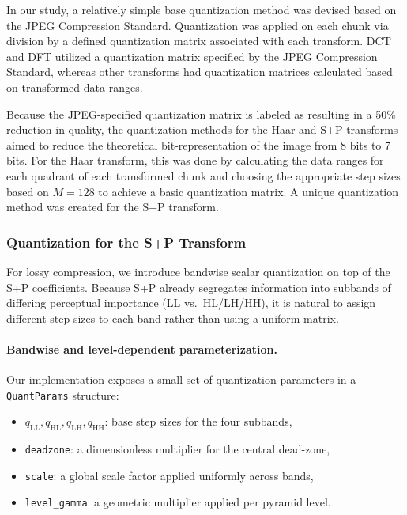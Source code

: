 In our study, a relatively simple base quantization method was devised based on the JPEG Compression Standard. Quantization was applied on each chunk via division by a defined quantization matrix associated with each transform. DCT and DFT utilized a quantization matrix specified by the JPEG Compression Standard, whereas other transforms had quantization matrices calculated based on transformed data ranges.

Because the JPEG-specified quantization matrix is labeled as resulting in a 50\% reduction in quality, the quantization methods for the Haar and S+P transforms aimed to reduce the theoretical bit-representation of the image from 8 bits to 7 bits. For the Haar transform, this was done by calculating the data ranges for each quadrant of each transformed chunk and choosing the appropriate step sizes based on $M = 128$ to achieve a basic quantization matrix. A unique quantization method was created for the S+P transform. 
\subsubsection{Quantization for the S+P Transform}

For lossy compression, we introduce bandwise scalar quantization on top of the
S+P coefficients. Because S+P already segregates information into subbands of
differing perceptual importance (LL vs.\ HL/LH/HH), it is natural to assign
different step sizes to each band rather than using a uniform matrix.

\paragraph{Bandwise and level-dependent parameterization.}
Our implementation exposes a small set of quantization parameters in a
\texttt{QuantParams} structure:
\begin{itemize}
    \item $q_{\mathrm{LL}}, q_{\mathrm{HL}}, q_{\mathrm{LH}}, q_{\mathrm{HH}}$: base step sizes for the four subbands,
    \item \texttt{deadzone}: a dimensionless multiplier for the central dead-zone,
    \item \texttt{scale}: a global scale factor applied uniformly across bands,
    \item \texttt{level\_gamma}: a geometric multiplier applied per pyramid level.
\end{itemize}

